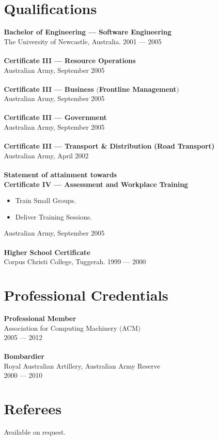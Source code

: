 \documentclass[a4paper]{article}
\begin{document}
\section*{Qualifications}
\textbf{Bachelor of Engineering --- Software Engineering}\\
The University of Newcastle, Australia. 2001 --- 2005\\\\
\textbf{Certificate III --- Resource Operations}\\
Australian Army, September 2005\\\\
\textbf{Certificate III --- Business $($Frontline Management$)$}\\
Australian Army, September 2005\\\\
\textbf{Certificate III --- Government}\\
Australian Army, September 2005\\\\
\textbf{Certificate III --- Transport \& Distribution (Road Transport)}\\
Australian Army, April 2002\\\\
\textbf{Statement of attainment towards\\Certificate IV --- Assessment and Workplace Training}
\begin{itemize}
\item Train Small Groups.
\item Deliver Training Sessions.
\end{itemize}
Australian Army, September 2005\\\\
\textbf{Higher School Certificate}\\
Corpus Christi College, Tuggerah. 1999 --- 2000
\vspace{5pt}
\section*{Professional Credentials}
\textbf{Professional Member}\\
Association for Computing Machinery $($ACM$)$\\
2005 --- 2012\\\\
\textbf{Bombardier}\\
Royal Australian Artillery, Australian Army Reserve\\
2000 --- 2010
\section*{Referees}
Available on request.
\end{document}
